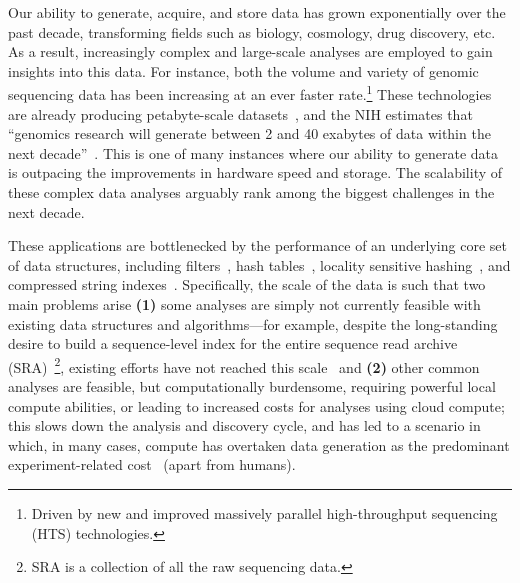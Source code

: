 Our ability to generate, acquire, and store data has grown exponentially over
the past decade, transforming fields such as biology, cosmology, drug
discovery, etc.   As a result, increasingly complex
and large-scale analyses are employed to gain insights into this data.  For
instance, both the volume and variety of genomic sequencing data has been
increasing at an ever faster rate.\footnote{Driven by new and improved
massively parallel high-throughput sequencing (HTS) technologies.}  These
technologies are already producing petabyte-scale
datasets~\cite{kodama2012sequence}, and the NIH estimates that ``genomics
research will generate between 2 and 40 exabytes of data within the next
decade''~\cite{NHGRIDataScience}. This is one of many instances where our
ability to generate data is outpacing the improvements in hardware speed and
storage. The scalability of these complex data analyses arguably rank among
the biggest challenges in the next decade. 

These applications are bottlenecked by the performance of an underlying core
set of data structures, including filters~\cite{PandeyAlBe18, solomon2016fast},
hash tables~\cite{solomon2016fast,almodaresi2022incrementally}, locality
sensitive hashing~\cite{Marais2019}, and compressed string
indexes~\cite{Almodaresi2018Pufferfish}. Specifically, the scale of the data is
such that two main problems arise \textbf{(1)} some analyses are simply not
currently feasible with existing data structures and algorithms---for example,
despite the long-standing desire to build a sequence-level index for the entire
sequence read archive (SRA)~\footnote{SRA is a collection of all the raw
sequencing data.}, existing efforts have not reached this
scale~\cite{Karasikov2020, HarrisM20, SolomonK17, almodaresi2022incrementally,
AlmodaresiPFJP20,PandeyAlBe18} and \textbf{(2)} other common analyses are
feasible, but computationally burdensome, requiring powerful local compute
abilities, or leading to increased costs for analyses using cloud compute; this
slows down the analysis and discovery cycle, and has led to a scenario in
which, in many cases, compute has overtaken data generation as the predominant
experiment-related cost~\cite{Muir_2016} (apart from humans).


